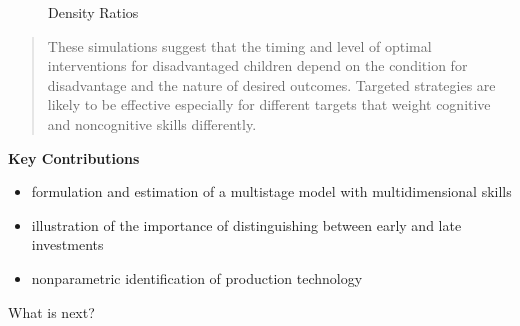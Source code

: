 \begin{frame}\begin{figure}\caption{Density Ratios}\vspace{0.3cm}
\end{figure}\end{frame}
\begin{frame}
\begin{quote}
These simulations suggest that the timing and level of optimal interventions for disadvantaged children depend on the condition for disadvantage and the nature of desired outcomes. Targeted strategies are likely to be effective especially for different targets that weight cognitive and noncognitive skills differently.
\end{quote}
\end{frame}
\begin{frame}\textbf{Key Contributions}\vspace{0.3cm}

\begin{itemize}\setlength\itemsep{1em}
\item formulation and estimation of a multistage model with multidimensional skills
\item illustration of the importance of distinguishing between early and late investments
\item nonparametric identification of production technology
\end{itemize}\vspace{0.3cm}

What is next?

\end{frame}
